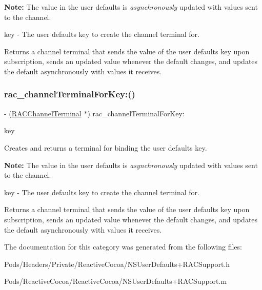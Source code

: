 {\bfseries Note\+:} The value in the user defaults is {\itshape asynchronously} updated with values sent to the channel.

key -\/ The user defaults key to create the channel terminal for.

Returns a channel terminal that sends the value of the user defaults key upon subscription, sends an updated value whenever the default changes, and updates the default asynchronously with values it receives. \mbox{\label{category_n_s_user_defaults_07_r_a_c_support_08_a7a8d6f1a01e63adb036a2841884ae4b5}} 
\subsubsection{\texorpdfstring{rac\+\_\+channel\+Terminal\+For\+Key\+:()}{rac\_channelTerminalForKey:()}\hspace{0.1cm}{\footnotesize\ttfamily [3/3]}}
{\footnotesize\ttfamily -\/ (\mbox{\hyperlink{interface_r_a_c_channel_terminal}{R\+A\+C\+Channel\+Terminal}} $\ast$) rac\+\_\+channel\+Terminal\+For\+Key\+: \begin{DoxyParamCaption}\item[{(N\+S\+String $\ast$)}]{key }\end{DoxyParamCaption}}

Creates and returns a terminal for binding the user defaults key.

{\bfseries Note\+:} The value in the user defaults is {\itshape asynchronously} updated with values sent to the channel.

key -\/ The user defaults key to create the channel terminal for.

Returns a channel terminal that sends the value of the user defaults key upon subscription, sends an updated value whenever the default changes, and updates the default asynchronously with values it receives. 

The documentation for this category was generated from the following files\+:\begin{DoxyCompactItemize}
\item 
Pods/\+Headers/\+Private/\+Reactive\+Cocoa/N\+S\+User\+Defaults+\+R\+A\+C\+Support.\+h\item 
Pods/\+Reactive\+Cocoa/\+Reactive\+Cocoa/N\+S\+User\+Defaults+\+R\+A\+C\+Support.\+m\end{DoxyCompactItemize}
